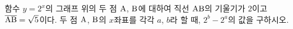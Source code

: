 함수 $y=2^{x}$의 그래프 위의 두 점 $\mathrm{A}$, $\mathrm{B}$에 대하여 직선 $\mathrm{AB}$의 기울기가 $2$이고 $\overline{\mathrm{AB}}=\sqrt{5}$이다. 두 점 $\mathrm{A}$, $\mathrm{B}$의 $x$좌표를 각각 $a$, $b$라 할 때, $2^{b}-2^{a}$의 값을 구하시오. 
